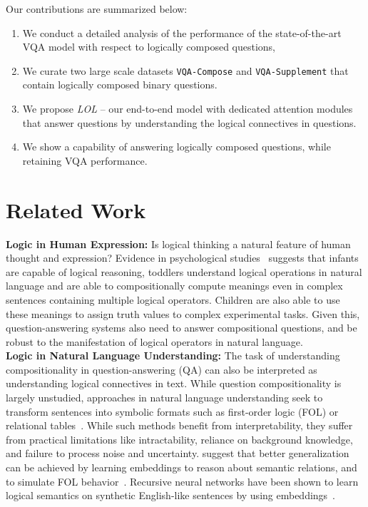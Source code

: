 Our contributions are summarized below:
\begin{enumerate}[noitemsep]
    \item We conduct a detailed analysis of the performance of the state-of-the-art VQA model with respect to logically composed questions,
    \item We curate two large scale datasets \texttt{VQA-Compose} and \texttt{VQA-Supplement} that contain logically composed binary questions.
    \item We propose \textit{LOL} -- our end-to-end model with dedicated attention modules that answer questions by understanding the logical connectives in questions.
    \item We show a capability of answering logically composed questions, while retaining VQA performance. %
\end{enumerate}

\section{Related Work}
\noindent\textbf{Logic in Human Expression:}
Is logical thinking a natural feature of human thought and expression?
Evidence in psychological studies~\citep{carey1985conceptual,gopnik1999scientist,arlotti1263} suggests that infants are capable of logical reasoning, toddlers understand logical operations in natural language and are able to compositionally compute meanings even in complex sentences containing multiple logical operators.
Children are also able to use these meanings to assign truth values to complex experimental tasks.
Given this, question-answering systems also need to answer compositional questions, and be robust to the manifestation of logical operators in natural language.\\

\noindent\textbf{Logic in Natural Language Understanding:}
The task of understanding compositionality in question-answering (QA) can also be interpreted as understanding logical connectives in text.
While question compositionality is largely unstudied, approaches in natural language understanding seek to transform sentences into symbolic formats such as first-order logic (FOL) or relational tables~\citep{mintz2009distant,zettlemoyer2012learning,lewis-steedman-2013-combined}.
While such methods benefit from interpretability, they suffer from practical limitations like intractability, reliance on background knowledge, and failure to process noise and uncertainty. 
\citep{bordes2013translating,riedel-etal-2013-relation,socher2013reasoning} suggest that better generalization can be achieved by learning embeddings to reason about semantic relations, and to simulate FOL behavior~\citep{rocktaschel2014low}.
Recursive neural networks have been shown to learn logical semantics on synthetic English-like sentences by using embeddings~\citep{bowman2014recursive,neelakantan2015compositional}.

